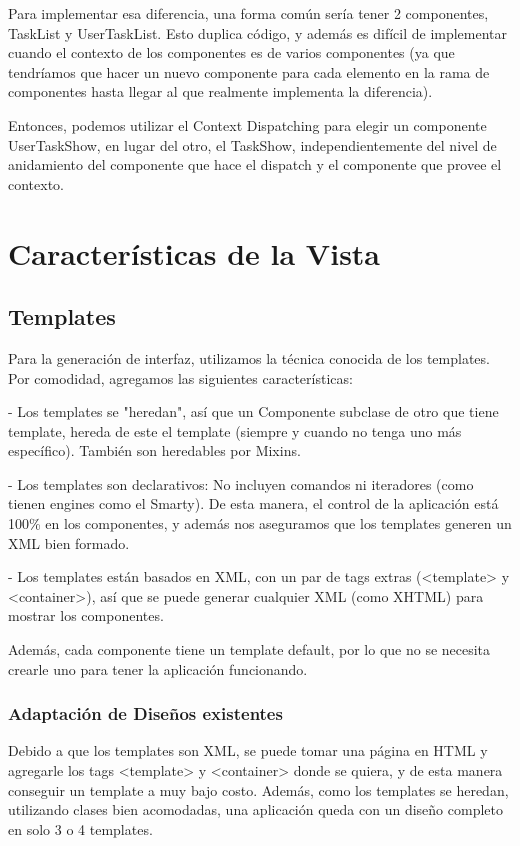 Para implementar esa diferencia, una forma común sería tener 2 componentes, TaskList y UserTaskList. Esto duplica código, y además es difícil de implementar cuando el contexto de los componentes es de varios componentes (ya que tendríamos que hacer un nuevo componente para cada elemento en la rama de componentes hasta llegar al que realmente implementa la diferencia).

Entonces, podemos utilizar el Context Dispatching para elegir un componente UserTaskShow, en lugar del otro, el TaskShow, independientemente del nivel de anidamiento del componente que hace el dispatch y el componente que provee el contexto.


\section{Características de la Vista}

\subsection{Templates}
\label{sub-templates}
Para la generación de interfaz, utilizamos la técnica conocida de los templates.
Por comodidad, agregamos las siguientes características:

- Los templates se "heredan", así que un Componente subclase de otro que tiene template, hereda de este el
template (siempre y cuando no tenga uno más específico). También son heredables por Mixins.

- Los templates son declarativos: No incluyen comandos ni iteradores (como tienen engines como el Smarty). De esta manera, el control de la aplicación está 100\% en los componentes, y además nos aseguramos que los
templates generen un XML bien formado.

- Los templates están basados en XML, con un par de tags extras (<template> y <container>), así que se puede
generar cualquier XML (como XHTML) para mostrar los componentes.

Además, cada componente tiene un template default, por lo que no se necesita crearle uno para tener la aplicación
funcionando.

\subsubsection{Adaptación de Diseños existentes}
\label{sub-templates-adapt}
Debido a que los templates son XML, se puede tomar una página en HTML y agregarle los tags <template> y <container> donde se quiera, y de esta manera conseguir un template a muy bajo costo. Además, como los templates se heredan, utilizando clases bien acomodadas, una aplicación queda con un diseño completo en solo 3 o 4 templates.

